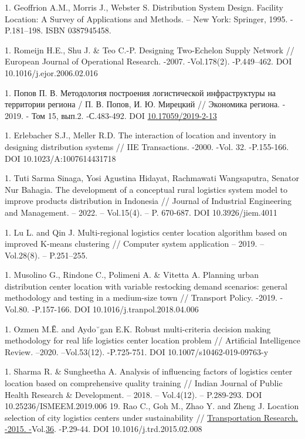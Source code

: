 \begin{references}
1. Geoffrion A.M., Morris J., Webster S. Distribution System Design.
Facility Location: A Survey of Applications and Methods. -- New York:
Springer, 1995. -P.181--198. ISBN 0387945458.

1. Romeijn H.E., Shu J. \& Teo C.-P. Designing Two-Echelon Supply Network
// European Journal of Operational Research. -2007. -Vol.178(2).
-P.449--462.
DOI 10.1016/j.ejor.2006.02.016

1. Попов П. В. Методология построения логистической инфраструктуры на
территории региона / П. В. Попов, И. Ю. Мирецкий // Экономика региона.
- 2019. - Том 15, вып.2. -С.483-492. DOI
\href{http://dx.doi.org/10.17059/2019-2-13}{10.17059/2019-2-13}

1. Erlebacher S.J., Meller R.D. The interaction of location and inventory
in designing distribution systems // IIE Transactions. -2000. -Vol.
32. -P.155-166. DOI 10.1023/A:1007614431718

1. Tuti Sarma Sinaga, Yosi Agustina Hidayat, Rachmawati Wangsaputra,
Senator Nur Bahagia. The development of a conceptual rural logistics
system model to improve products distribution in Indonesia // Journal
of Industrial Engineering and Management. -- 2022. -- Vol.15(4). -- P.
670-687. DOI 10.3926/jiem.4011

1. Lu L. and Qin J. Multi-regional logistics center location algorithm
based on improved K-means clustering // Computer system application --
2019. -- Vol.28(8). -- P.251--255.

1. Musolino G., Rindone C., Polimeni A. \& Vitetta A. Planning urban
distribution center location with variable restocking demand
scenarios: general methodology and testing in a medium-size town //
Transport Policy. -2019. -Vol.80. -P.157-166. DOI
10.1016/j.tranpol.2018.04.006

1. Ozmen M.Ё. and Aydo˘gan E.K. Robust multi-criteria decision making
methodology for real life logistics center location problem //
Artificial Intelligence Review. --2020. --Vol.53(12). -P.725-751.
DOI 10.1007/s10462-019-09763-y

1. Sharma R. \& Sungheetha A. Analysis of influencing factors of
logistics center location based on comprehensive quality training //
Indian Journal of Public Health Research \& Development. -- 2018. --
Vol.4(12). -- P.289-293. DOI 10.25236/ISMEEM.2019.006
19. Rao C., Goh M., Zhao Y. and Zheng J. Location selection of city
logistics centers under sustainability //
\href{https://www.sciencedirect.com/journal/transportation-research-part-d-transport-and-environment}{Transportation
Research. -2015.
-}Vol.\href{file:///C:/Users/admin/Desktop/загрузки/36}{36}. -P.29-44.
DOI 10.1016/j.trd.2015.02.008


\end{references}
